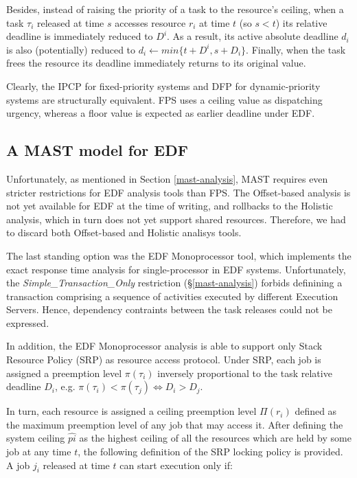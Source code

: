 \documentclass{article}
\begin{document}
Besides, instead of raising the priority of a task to the resource's ceiling, when a task $\tau_i$ released at time $s$ accesses resource $r_i$ at time $t$ (so $s < t$) its relative deadline is immediately reduced to $D^i$. As a result, its active absolute deadline $d_i$ is also (potentially) reduced to $d_i \leftarrow min\{t + D^i, s + D_i\}$. Finally, when the task frees the resource its deadline immediately returns to its original value.

Clearly, the IPCP for fixed-priority systems and DFP for dynamic-priority systems are structurally equivalent. FPS uses a ceiling value as dispatching urgency, whereas a floor value is expected as earlier deadline under EDF.

\subsection{A MAST model for EDF}

Unfortunately, as mentioned in Section \ref{mast-analysis}, MAST requires even stricter restrictions for EDF analysis tools than FPS. The Offset-based analysis is not yet available for EDF at the time of writing, and rollbacks to the Holistic analysis, which in turn does not yet support shared resources. Therefore, we had to discard both Offset-based and Holistic analisys tools.

The last standing option was the EDF Monoprocessor tool, which implements the exact response time analysis for single-processor in EDF systems. Unfortunately, the \textit{Simple\_Transaction\_Only} restriction (§\ref{mast-analysis}) forbids definining a transaction comprising a sequence of activities executed by different Execution Servers. Hence, dependency contraints between the task releases could not be expressed.

In addition, the EDF Monoprocessor analysis is able to support only Stack Resource Policy (SRP) \cite{resource-sharing} as resource access protocol. Under SRP, each job is assigned a preemption level $\pi(\tau_i)$ inversely proportional to the task relative deadline $D_i$, e.g. $\pi(\tau_i) < \pi(\tau_j) \Leftrightarrow D_i > D_j$.

In turn, each resource is assigned a ceiling preemption level $\Pi(r_i)$ defined as the maximum preemption level of any job that may access it. After defining the system ceiling $\hat{pi}$ as the highest ceiling of all the resources which are held by some job at any time $t$, the following definition of the SRP locking policy is provided. A job $j_i$ released at time $t$ can start execution only if:
\end{document}
